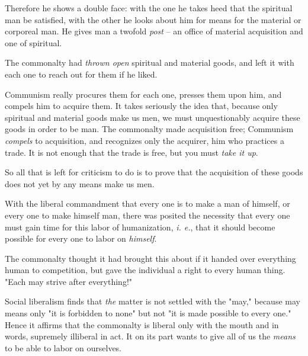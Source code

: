 Therefore he shows a double face: with the one he takes heed that the 
spiritual man be satisfied, with the other he looks about him for means for 
the material or corporeal man. He gives man a twofold \textit{post} -- an 
office of material acquisition and one of spiritual.

The commonalty had \textit{thrown open} spiritual and material goods, and left 
it with each one to reach out for them if he liked.

Communism really procures them for each one, presses them upon him, and 
compels him to acquire them. It takes seriously the idea that, because only 
spiritual and material goods make us men, we must unquestionably acquire these 
goods in order to be man. The commonalty made acquisition free; Communism 
\textit{compels} to acquisition, and recognizes only the acquirer, him who 
practices a trade. It is not enough that the trade is free, but you must 
\textit{take it up}.

So all that is left for criticism to do is to prove that the acquisition of 
these goods does not yet by any means make us men.

With the liberal commandment that every one is to make a man of himself, or 
every one to make himself man, there was posited the necessity that every one 
must gain time for this labor of humanization, \textit{i. e.}, that it should 
become possible for every one to labor on \textit{himself}.

The commonalty thought it had brought this about if it handed over everything 
human to competition, but gave the individual a right to every human thing. 
"{}Each may strive after everything!"{}

Social liberalism finds that \textit{the} matter is not settled with the 
"{}may,"{} because may means only "{}it is forbidden to none"{} but not "{}it 
is made possible to every one."{} Hence it affirms that the commonalty is 
liberal only with the mouth and in words, supremely illiberal in act. It on 
its part wants to give all of us the \textit{means} to be able to labor on 
ourselves.

